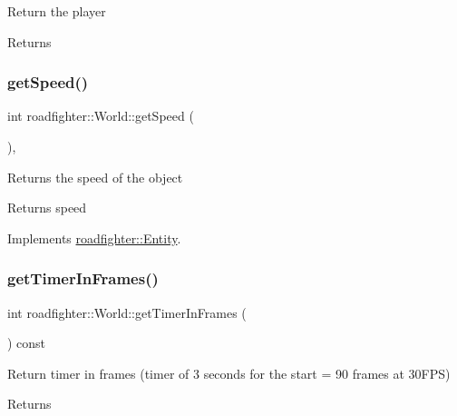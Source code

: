 Return the player \begin{DoxyReturn}{Returns}

\end{DoxyReturn}
\mbox{\label{classroadfighter_1_1World_a0ec7ca6d1df344ec56cf55d6d436b24c}} 
\subsubsection{\texorpdfstring{get\+Speed()}{getSpeed()}}
{\footnotesize\ttfamily int roadfighter\+::\+World\+::get\+Speed (\begin{DoxyParamCaption}{ }\end{DoxyParamCaption})\hspace{0.3cm}{\ttfamily [override]}, {\ttfamily [virtual]}}

Returns the speed of the object \begin{DoxyReturn}{Returns}
speed 
\end{DoxyReturn}


Implements \hyperlink{classroadfighter_1_1Entity_ad3760184d764a61922e1db7d98501ee4}{roadfighter\+::\+Entity}.

\mbox{\label{classroadfighter_1_1World_a13b25cd325f06cc775e5ddcf9945e5ed}} 
\subsubsection{\texorpdfstring{get\+Timer\+In\+Frames()}{getTimerInFrames()}}
{\footnotesize\ttfamily int roadfighter\+::\+World\+::get\+Timer\+In\+Frames (\begin{DoxyParamCaption}{ }\end{DoxyParamCaption}) const}

Return timer in frames (timer of 3 seconds for the start = 90 frames at 30\+F\+PS) \begin{DoxyReturn}{Returns}

\end{DoxyReturn}
\mbox{\label{classroadfighter_1_1World_a5ddc1887b0773cb74d533cb7232282e9}} 
